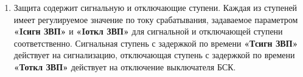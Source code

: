 \begin{enumerate}

\item
Защита содержит сигнальную и отключающие ступени. Каждая из ступеней имеет регулируемое значение по току срабатывания, задаваемое параметром \textbf{«Iсигн ЗВП»} и \textbf{«Iоткл ЗВП»} для сигнальной и отключающей ступени соответственно. Сигнальная ступень с задержкой по времени \textbf{«Тсигн ЗВП»} действует на сигнализацию, отключающая ступень с задержкой по времени \textbf{«Тоткл ЗВП»} действует на  отключение выключателя БСК. 


\end{enumerate} 